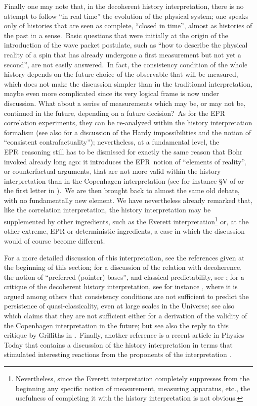 \documentclass[12pt,onecolumn]{article}%
\begin{document}
Finally one may note that, in the decoherent history interpretation, there is
no attempt to follow ``in real time'' the evolution of the physical system;
one speaks only of histories that are seen as complete, ``closed in time'',
almost as histories of the past in a sense.\ Basic questions that were
initially at the origin of the introduction of the wave packet postulate, such
as ``how to describe the physical reality of a spin that has already undergone
a first measurement but not yet a second'', are not easily answered.\ In fact,
the consistency condition of the whole history depends on the future choice of
the observable that will be measured, which does not make the discussion
simpler than in the traditional interpretation, maybe even more complicated
since its very logical frame is now under discussion. What about a series of
measurements which may be, or may not be, continued in the future, depending
on a future decision?\ As for the EPR correlation experiments, they can be
re-analyzed within the history interpretation formalism \cite{Griffiths-4}
(see also \cite{Griffiths-5} for a discussion of the Hardy impossibilities and
the notion of ``consistent contrafactuality''); nevertheless, at a fundamental
level, the EPR\ reasoning still has to be dismissed for exactly the same
reason that Bohr invoked already long ago: it introduces the EPR\ notion of
``elements of reality'', or counterfactual arguments, that are not more valid
within the history interpretation than in the Copenhagen interpretation (see
for instance \S V of \cite{Griffiths-4} or the first letter in
\cite{reactions}).\ We are then brought back to almost the same old debate,
with no fundamentally new element. We have nevertheless already remarked that,
like the correlation interpretation, the history interpretation may be
supplemented by other ingredients, such as the Everett
interpretation\footnote{Nevertheless, since the Everett interpretation
completely suppresses from the beginning any specific notion of measurement,
measuring apparatus, etc., the usefulness of completing it with the history
interpretation is not obvious.} or, at the other extreme, EPR or deterministic
ingredients, a case in which the discussion would of course become different.

For a more detailed discussion of this interpretation, see the references
given at the beginning of this section; for a discussion of the relation with
decoherence, the notion of ``preferred (pointer) bases'', and classical
predictability, see \cite{Zurek}; for a critique of the decoherent history
interpretation, see for instance \cite{Dowker}, where it is argued among
others that consistency conditions are not sufficient to predict the
persistence of quasi-classicality, even at large scales in the Universe; see
also \cite{Kent} which claims that they are not sufficient either for a
derivation of the validity of the Copenhagen interpretation in the future; but
see also the reply to this critique by Griffiths in \cite{Griffiths-3}%
.\ Finally, another reference is a recent article in Physics Today
\cite{Goldstein} that contains a discussion of the history interpretation in
terms that stimulated interesting reactions from the proponents of the
interpretation \cite{reactions}.
\end{document}
